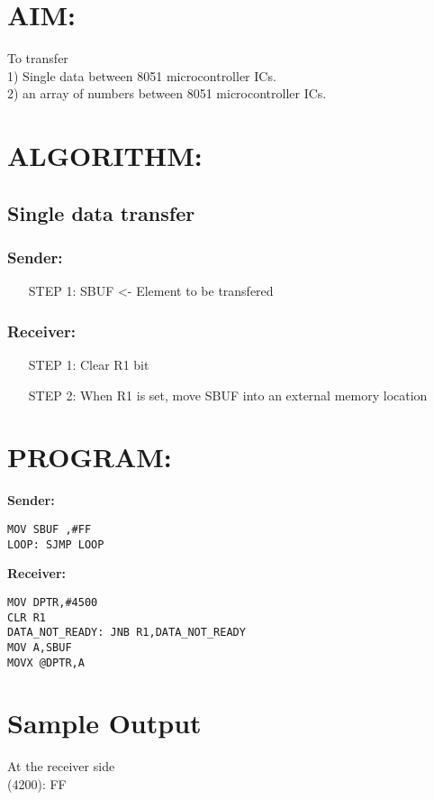 
\section*{AIM:}
To transfer \\
 1) Single data between 8051 microcontroller ICs.\\
 2) an array of numbers  between 8051 microcontroller ICs.

\section*{ALGORITHM:}

\subsection*{Single data transfer}
\subsubsection{Sender:}
\begin{enumerate}
	\item[STEP] 1: SBUF <- Element to be transfered
\end{enumerate}
\subsubsection{Receiver:}
\begin{itemize}
\item[STEP] 1: Clear R1 bit 
\item[STEP] 2: When R1 is set, move SBUF into an external memory location
\end{itemize}



\section*{PROGRAM:}
\textbf{Sender:}
\begin{lstlisting}
MOV SBUF ,#FF
LOOP: SJMP LOOP
\end{lstlisting}

\vspace{20pt}

\textbf{Receiver:}
\begin{lstlisting}
MOV DPTR,#4500
CLR R1 
DATA_NOT_READY: JNB R1,DATA_NOT_READY
MOV A,SBUF
MOVX @DPTR,A
\end{lstlisting}




\section*{Sample Output}
At the receiver side\\
(4200): FF

